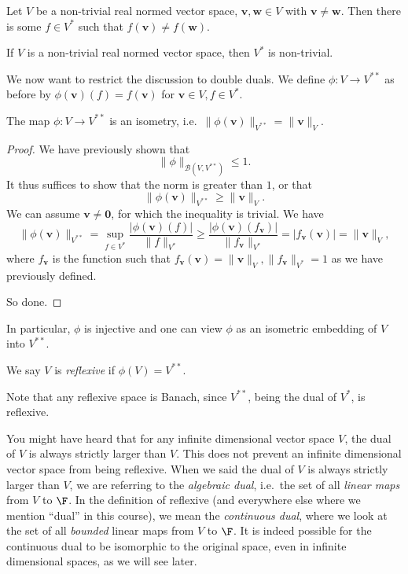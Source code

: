 \documentclass[a4paper]{article}
\begin{document}
\begin{cor}
  Let $V$ be a non-trivial real normed vector space, $\mathbf{v}, \mathbf{w}\in V$ with $\mathbf{v}\not= \mathbf{w}$. Then there is some $f\in V^*$ such that $f(\mathbf{v}) \not= f(\mathbf{w})$.
\end{cor}

\begin{cor}
  If $V$ is a non-trivial real normed vector space, then $V^*$ is non-trivial.
\end{cor}

We now want to restrict the discussion to double duals. We define $\phi: V\to V^{**}$ as before by $\phi(\mathbf{v})(f) = f(\mathbf{v})$ for $\mathbf{v}\in V, f\in V^*$.

\begin{prop}
  The map $\phi: V\to V^{**}$ is an isometry, i.e.\ $\|\phi(\mathbf{v})\|_{V^{**}} = \|\mathbf{v}\|_V$.
\end{prop}

\begin{proof}
  We have previously shown that
  \[
    \|\phi\|_{\mathcal{B}(V, V^{**})} \leq 1.
  \]
  It thus suffices to show that the norm is greater than $1$, or that
  \[
    \|\phi(\mathbf{v})\|_{V^{**}} \geq \|\mathbf{v}\|_V.
  \]
  We can assume $\mathbf{v}\not= \mathbf{0}$, for which the inequality is trivial. We have
  \[
    \|\phi(\mathbf{v})\|_{V^{**}} = \sup_{f\in V^*} \frac{|\phi(\mathbf{v})(f)|}{\|f\|_{V^*}} \geq \frac{|\phi(\mathbf{v})(f_\mathbf{v})|}{\|f_\mathbf{v}\|_{V^*}} = |f_\mathbf{v}(\mathbf{v})| = \|\mathbf{v}\|_V,
  \]
  where $f_\mathbf{v}$ is the function such that $f_\mathbf{v}(\mathbf{v}) = \|\mathbf{v}\|_V, \|f_\mathbf{v}\|_{V^*} = 1$ as we have previously defined.

  So done.
\end{proof}

In particular, $\phi$ is injective and one can view $\phi$ as an isometric embedding of $V$ into $V^{**}$.

\begin{defi}[Reflexive]
  We say $V$ is \emph{reflexive} if $\phi(V) = V^{**}$.
\end{defi}
Note that any reflexive space is Banach, since $V^{**}$, being the dual of $V^*$, is reflexive.

You might have heard that for any infinite dimensional vector space $V$, the dual of $V$ is always strictly larger than $V$. This does not prevent an infinite dimensional vector space from being reflexive. When we said the dual of $V$ is always strictly larger than $V$, we are referring to the \emph{algebraic dual}, i.e.\ the set of all \emph{linear maps} from $V$ to $\F$. In the definition of reflexive (and everywhere else where we mention ``dual'' in this course), we mean the \emph{continuous dual}, where we look at the set of all \emph{bounded} linear maps from $V$ to $\F$. It is indeed possible for the continuous dual to be isomorphic to the original space, even in infinite dimensional spaces, as we will see later.
\end{document}

